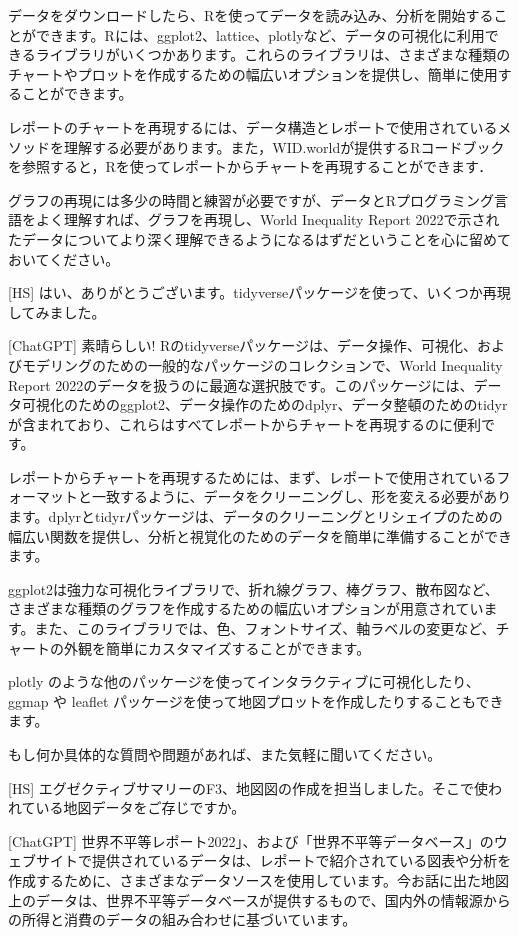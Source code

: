 \documentclass[
]{bxjsbook}
\theoremstyle{definition}
\theoremstyle{definition}
\theoremstyle{definition}
\theoremstyle{definition}
\theoremstyle{remark}
\begin{document}
データをダウンロードしたら、Rを使ってデータを読み込み、分析を開始することができます。Rには、ggplot2、lattice、plotlyなど、データの可視化に利用できるライブラリがいくつかあります。これらのライブラリは、さまざまな種類のチャートやプロットを作成するための幅広いオプションを提供し、簡単に使用することができます。

レポートのチャートを再現するには、データ構造とレポートで使用されているメソッドを理解する必要があります。また，WID.worldが提供するRコードブックを参照すると，Rを使ってレポートからチャートを再現することができます．

グラフの再現には多少の時間と練習が必要ですが、データとRプログラミング言語をよく理解すれば、グラフを再現し、World Inequality Report 2022で示されたデータについてより深く理解できるようになるはずだということを心に留めておいてください。

{[}HS{]} はい、ありがとうございます。tidyverseパッケージを使って、いくつか再現してみました。

{[}ChatGPT{]} 素晴らしい! Rのtidyverseパッケージは、データ操作、可視化、およびモデリングのための一般的なパッケージのコレクションで、World Inequality Report 2022のデータを扱うのに最適な選択肢です。このパッケージには、データ可視化のためのggplot2、データ操作のためのdplyr、データ整頓のためのtidyrが含まれており、これらはすべてレポートからチャートを再現するのに便利です。

レポートからチャートを再現するためには、まず、レポートで使用されているフォーマットと一致するように、データをクリーニングし、形を変える必要があります。dplyrとtidyrパッケージは、データのクリーニングとリシェイプのための幅広い関数を提供し、分析と視覚化のためのデータを簡単に準備することができます。

ggplot2は強力な可視化ライブラリで、折れ線グラフ、棒グラフ、散布図など、さまざまな種類のグラフを作成するための幅広いオプションが用意されています。また、このライブラリでは、色、フォントサイズ、軸ラベルの変更など、チャートの外観を簡単にカスタマイズすることができます。

plotly のような他のパッケージを使ってインタラクティブに可視化したり、ggmap や leaflet パッケージを使って地図プロットを作成したりすることもできます。

もし何か具体的な質問や問題があれば、また気軽に聞いてください。

{[}HS{]} エグゼクティブサマリーのF3、地図図の作成を担当しました。そこで使われている地図データをご存じですか。

{[}ChatGPT{]} 世界不平等レポート2022」、および「世界不平等データベース」のウェブサイトで提供されているデータは、レポートで紹介されている図表や分析を作成するために、さまざまなデータソースを使用しています。今お話に出た地図上のデータは、世界不平等データベースが提供するもので、国内外の情報源からの所得と消費のデータの組み合わせに基づいています。
\end{document}
